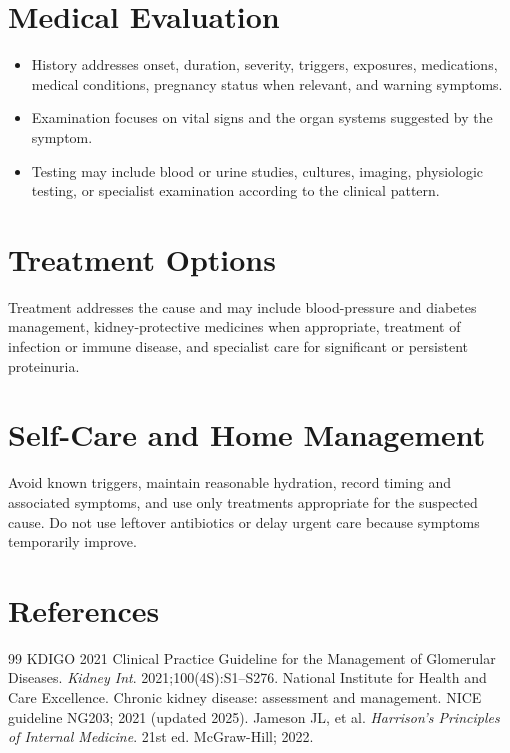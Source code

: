 \section*{Medical Evaluation}
\begin{itemize}
  \item History addresses onset, duration, severity, triggers, exposures, medications, medical conditions, pregnancy status when relevant, and warning symptoms.
  \item Examination focuses on vital signs and the organ systems suggested by the symptom.
  \item Testing may include blood or urine studies, cultures, imaging, physiologic testing, or specialist examination according to the clinical pattern.
\end{itemize}

\section*{Treatment Options}
Treatment addresses the cause and may include blood-pressure and diabetes management, kidney-protective medicines when appropriate, treatment of infection or immune disease, and specialist care for significant or persistent proteinuria.

\section*{Self-Care and Home Management}
Avoid known triggers, maintain reasonable hydration, record timing and associated symptoms, and use only treatments appropriate for the suspected cause. Do not use leftover antibiotics or delay urgent care because symptoms temporarily improve.

\section*{References}
\begin{thebibliography}{99}
 KDIGO 2021 Clinical Practice Guideline for the Management of Glomerular Diseases. \textit{Kidney Int}. 2021;100(4S):S1--S276.
 National Institute for Health and Care Excellence. Chronic kidney disease: assessment and management. NICE guideline NG203; 2021 (updated 2025).
 Jameson JL, et al. \textit{Harrison's Principles of Internal Medicine}. 21st ed. McGraw-Hill; 2022.
\end{thebibliography}
